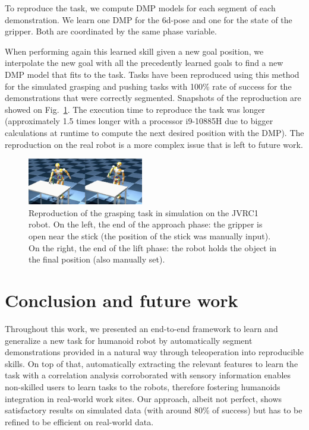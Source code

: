 \documentclass[conference]{IEEEtran}
\begin{document}
To reproduce the task, we compute DMP models for each segment of each demonstration. We learn one DMP for the 6d-pose and one for the state of the gripper. Both are coordinated by the same phase variable.

When performing again this learned skill given a new goal position, we interpolate the new goal with all the precedently learned goals to find a new DMP model that fits to the task. Tasks have been reproduced using this method for the simulated grasping and pushing tasks with 100\% rate of success for the demonstrations that were correctly segmented. Snapshots of the reproduction are showed on Fig.~\ref{fig:reproductionSim}. The execution time to reproduce the task was longer (approximately 1.5 times longer with a processor i9-10885H due to bigger calculations at runtime to compute the next desired position with the DMP). The reproduction on the real robot is a more complex issue that is left to future work. 

\begin{figure}[t]
  \centering
  \includegraphics[width=0.45\textwidth]{img/Reproduction.png}
  \caption{Reproduction of the grasping task in simulation on the JVRC1 robot. On the left, the end of the approach phase: the gripper is open near the stick (the position of the stick was manually input). On the right, the end of the lift phase: the robot holds the object in the final position (also manually set).}
  \label{fig:reproductionSim}
\end{figure}

\section{Conclusion and future work}\label{conclusion}

Throughout this work, we presented an end-to-end framework to learn and generalize a new task for humanoid robot by automatically segment demonstrations provided in a natural way through teleoperation into reproducible skills. 
On top of that, automatically extracting the relevant features to learn the task with a correlation analysis corroborated with sensory information enables non-skilled users to learn tasks to the robots, therefore fostering humanoids integration in real-world work sites. Our approach, albeit not perfect, shows satisfactory results on simulated data (with around 80\% of success) but has to be refined to be efficient on real-world data. \newline
\end{document}
